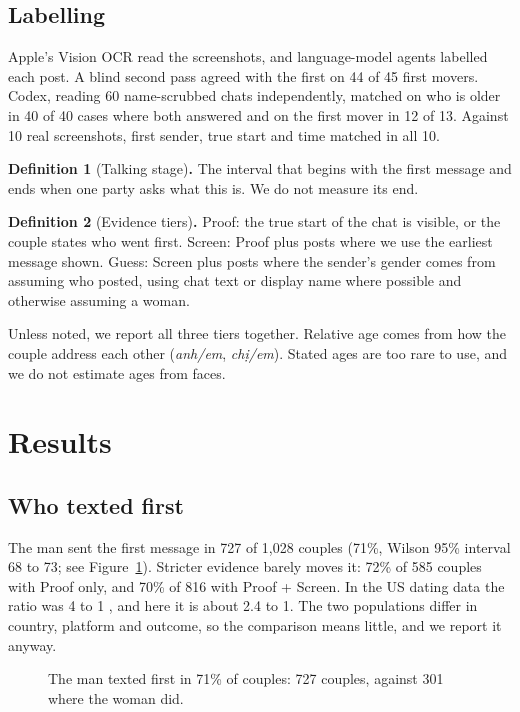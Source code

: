 \documentclass[10pt,letterpaper]{article}
\begin{document}
\subsection{Labelling}
Apple's Vision OCR read the screenshots, and language-model agents labelled each post. A blind second pass agreed with the first on 44 of 45 first movers. Codex, reading 60 name-scrubbed chats independently, matched on who is older in 40 of 40 cases where both answered and on the first mover in 12 of 13. Against 10 real screenshots, first sender, true start and time matched in all 10.

\textbf{Definition 1} (Talking stage)\textbf{.} The interval that begins with the first message and ends when one party asks what this is. We do not measure its end.

\textbf{Definition 2} (Evidence tiers)\textbf{.} Proof: the true start of the chat is visible, or the couple states who went first. Screen: Proof plus posts where we use the earliest message shown. Guess: Screen plus posts where the sender's gender comes from assuming who posted, using chat text or display name where possible and otherwise assuming a woman.

Unless noted, we report all three tiers together. Relative age comes from how the couple address each other (\emph{anh/em}, \emph{chị/em}). Stated ages are too rare to use, and we do not estimate ages from faces.

\section{Results}
\subsection{Who texted first}
The man sent the first message in 727 of 1,028 couples (71\%, Wilson 95\% interval \cite{wilson} 68 to 73; see Figure~\ref{fig0}). Stricter evidence barely moves it: 72\% of 585 couples with Proof only, and 70\% of 816 with Proof + Screen. In the US dating data the ratio was 4 to 1 \cite{kreager}, and here it is about 2.4 to 1. The two populations differ in country, platform and outcome, so the comparison means little, and we report it anyway.

\begin{figure}[ht]\centering {}\caption{The man texted first in 71\% of couples: 727 couples, against 301 where the woman did.}\label{fig0}\end{figure}
\end{document}
